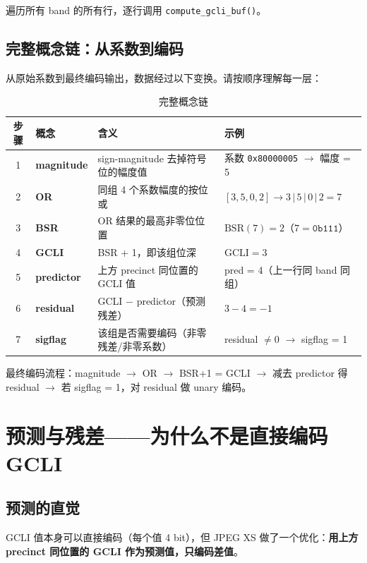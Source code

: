 遍历所有 band 的所有行，逐行调用 \texttt{compute\_gcli\_buf()}。

\subsection{完整概念链：从系数到编码}

从原始系数到最终编码输出，数据经过以下变换。请按顺序理解每一层：

\begin{table}[H]
\centering
\small
\caption{完整概念链}
\begin{tabular}{@{}cL{2.3cm}L{2.8cm}L{5.2cm}@{}}
\toprule
步骤 & 概念 & 含义 & 示例 \\
 & \textbf{magnitude} & sign-magnitude 去掉符号位的幅度值 & 系数 \texttt{0x80000005} $\to$ 幅度 = 5 \\
2 & \textbf{OR} & 同组 4 个系数幅度的按位或 & $[3, 5, 0, 2] \to 3\,|\,5\,|\,0\,|\,2 = 7$ \\
3 & \textbf{BSR} & OR 结果的最高非零位位置 & $\mathrm{BSR}(7) = 2$（$7 = \texttt{0b111}$） \\
4 & \textbf{GCLI} & BSR + 1，即该组位深 & $\mathrm{GCLI} = 3$ \\
5 & \textbf{predictor} & 上方 precinct 同位置的 GCLI 值 & pred = 4（上一行同 band 同组） \\
6 & \textbf{residual} & GCLI $-$ predictor（预测残差） & $3 - 4 = -1$ \\
7 & \textbf{sigflag} & 该组是否需要编码（非零残差/非零系数） & residual $\neq 0$ $\to$ sigflag = 1 \\
\bottomrule
\end{tabular}
\end{table}

最终编码流程：magnitude $\to$ OR $\to$ BSR+1 = GCLI $\to$ 减去 predictor 得 residual $\to$ 若 sigflag = 1，对 residual 做 unary 编码。

\section{预测与残差——为什么不是直接编码 GCLI}

\subsection{预测的直觉}

GCLI 值本身可以直接编码（每个值 4 bit），但 JPEG XS 做了一个优化：\textbf{用上方 precinct 同位置的 GCLI 作为预测值，只编码差值}。

